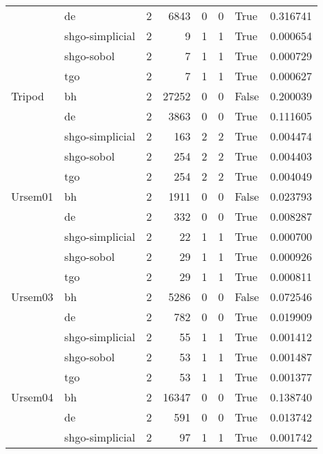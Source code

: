 \begin{longtable}{llrrrrlr}
         & de &     2 &     6843 &      0 &       0 &    True &    0.316741 \\
         & shgo-simplicial &     2 &        9 &      1 &       1 &    True &    0.000654 \\
         & shgo-sobol &     2 &        7 &      1 &       1 &    True &    0.000729 \\
         & tgo &     2 &        7 &      1 &       1 &    True &    0.000627 \\
Tripod & bh &     2 &    27252 &      0 &       0 &   False &    0.200039 \\
         & de &     2 &     3863 &      0 &       0 &    True &    0.111605 \\
         & shgo-simplicial &     2 &      163 &      2 &       2 &    True &    0.004474 \\
         & shgo-sobol &     2 &      254 &      2 &       2 &    True &    0.004403 \\
         & tgo &     2 &      254 &      2 &       2 &    True &    0.004049 \\
Ursem01 & bh &     2 &     1911 &      0 &       0 &   False &    0.023793 \\
         & de &     2 &      332 &      0 &       0 &    True &    0.008287 \\
         & shgo-simplicial &     2 &       22 &      1 &       1 &    True &    0.000700 \\
         & shgo-sobol &     2 &       29 &      1 &       1 &    True &    0.000926 \\
         & tgo &     2 &       29 &      1 &       1 &    True &    0.000811 \\
Ursem03 & bh &     2 &     5286 &      0 &       0 &   False &    0.072546 \\
         & de &     2 &      782 &      0 &       0 &    True &    0.019909 \\
         & shgo-simplicial &     2 &       55 &      1 &       1 &    True &    0.001412 \\
         & shgo-sobol &     2 &       53 &      1 &       1 &    True &    0.001487 \\
         & tgo &     2 &       53 &      1 &       1 &    True &    0.001377 \\
Ursem04 & bh &     2 &    16347 &      0 &       0 &    True &    0.138740 \\
         & de &     2 &      591 &      0 &       0 &    True &    0.013742 \\
         & shgo-simplicial &     2 &       97 &      1 &       1 &    True &    0.001742 \\

\end{longtable}

